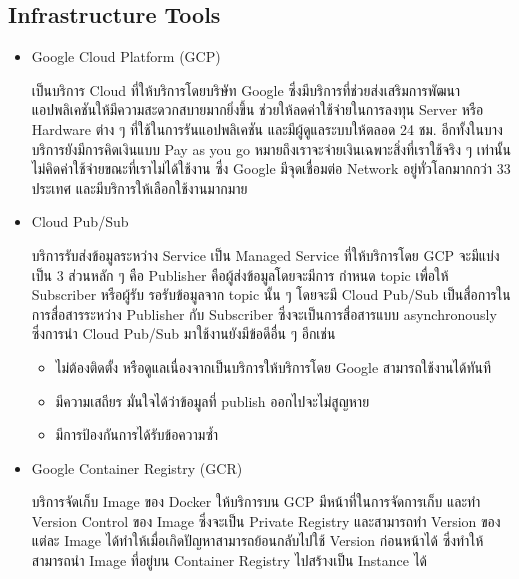 \documentclass[12pt,oneside,openright,a4paper]{cpe-thai-project}
\begin{document}
  \subsection{Infrastructure Tools}
    \begin{itemize}
      \item Google Cloud Platform (GCP)
      
      \hspace{1cm}เป็นบริการ Cloud ที่ให้บริการโดยบริษัท Google ซึ่งมีบริการที่ช่วยส่งเสริมการพัฒนาแอปพลิเคชันให้มีความสะดวกสบายมากยิ่งขึ้น 
      ช่วยให้ลดค่าใช้จ่ายในการลงทุน Server หรือ Hardware ต่าง ๆ ที่ใช้ในการรันแอปพลิเคชัน และมีผู้ดูแลระบบให้ตลอด 24 ชม. อีกทั้งในบางบริการยังมีการคิดเงินแบบ Pay as you go 
      หมายถึงเราจะจ่ายเงินเฉพาะสิ่งที่เราใช้จริง ๆ เท่านั้น ไม่คิดค่าใช้จ่ายขณะที่เราไม่ได้ใช้งาน ซึ่ง Google มีจุดเชื่อมต่อ Network อยู่ทั่วโลกมากกว่า 33 ประเทศ และมีบริการให้เลือกใช้งานมากมาย \cite{gcp}

      \item Cloud Pub/Sub
      
      \hspace{1cm}บริการรับส่งข้อมูลระหว่าง Service เป็น Managed Service ที่ให้บริการโดย GCP จะมีแบ่งเป็น 3 ส่วนหลัก ๆ 
      คือ Publisher คือผู้ส่งข้อมูลโดยจะมีการ กำหนด topic เพื่อให้ Subscriber หรือผู้รับ รอรับข้อมูลจาก topic นั้น ๆ 
      โดยจะมี Cloud Pub/Sub เป็นสื่อการในการสื่อสารระหว่าง Publisher กับ Subscriber ซึ่งจะเป็นการสื่อสารแบบ asynchronously \cite{pubsub} 
      ซึ่งการนำ Cloud Pub/Sub มาใช้งานยังมีข้อดีอื่น ๆ อีกเช่น
      \begin{itemize}
        \item ไม่ต้องติดตั้ง หรือดูแลเนื่องจากเป็นบริการให้บริการโดย Google สามารถใช้งานได้ทันที
        \item มีความเสถียร มั่นใจได้ว่าข้อมูลที่ publish ออกไปจะไม่สูญหาย
        \item มีการป้องกันการได้รับข้อความซ้ำ
      \end{itemize}

      \item Google Container Registry (GCR)
      
      \hspace{1cm}บริการจัดเก็บ Image ของ Docker ให้บริการบน GCP มีหน้าที่ในการจัดการเก็บ และทำ Version Control ของ Image 
      ซึ่งจะเป็น Private Registry และสามารถทำ Version ของแต่ละ Image ได้ทำให้เมื่อเกิดปัญหาสามารถย้อนกลับไปใช้ Version ก่อนหน้าได้ 
      ซึ่งทำให้สามารถนำ Image ที่อยู่บน Container Registry ไปสร้างเป็น Instance ได้ \cite{GCR}


\end{itemize}
\end{document}
